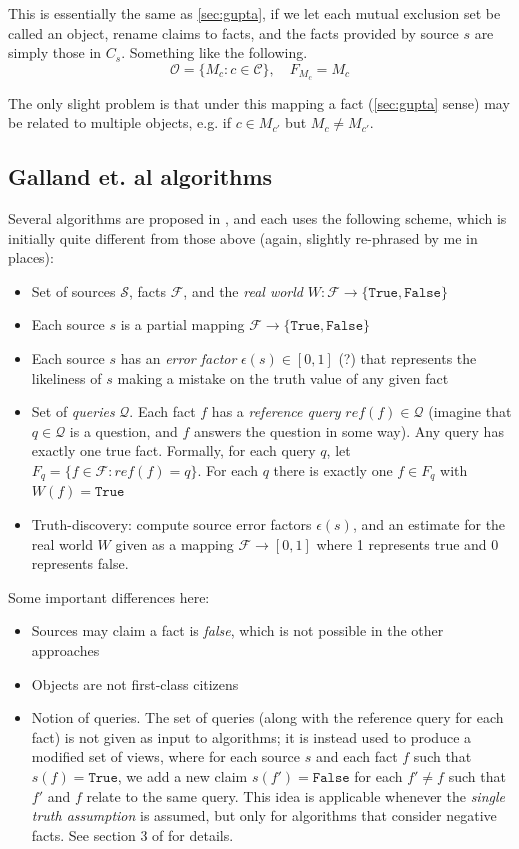 \documentclass{article}
\theoremstyle{definition} \newtheorem{definition}{Definition}
\theoremstyle{definition} \newtheorem{example}{Example}
\theoremstyle{plain} \newtheorem{axiom}{Axiom}
\theoremstyle{plain} \newtheorem*{remark}{Remark}
\theoremstyle{remark} \newtheorem*{notation}{Notation}
\theoremstyle{plain} \newtheorem{lemma}{Lemma}
\theoremstyle{plain} \newtheorem{proposition}{Proposition}
\renewcommand{\S}{\mathcal{S}}  %
\renewcommand{\O}{\mathcal{O}}  %
\newcommand{\F}{\mathcal{F}}
\begin{document}
This is essentially the same as \ref{sec:gupta}, if we let each mutual
exclusion set be called an object, rename claims to facts, and the facts
provided by source $s$ are simply those in $C_s$. Something like the following.
$$
\O = \{M_c : c \in \mathcal{C}\},
\quad
F_{M_c} = M_c
$$

The only slight problem is that under this mapping a fact (\ref{sec:gupta}
sense) may be related to multiple objects, e.g. if $c \in M_{c'}$ but $M_c \ne
M_{c'}$.

\subsection{Galland et. al algorithms}
\label{sec:galland}

Several algorithms are proposed in \cite{galland}, and each uses the following
scheme, which is initially quite different from those above (again, slightly
re-phrased by me in places):

\begin{itemize}
\item Set of sources $\S$, facts $\F$, and the \emph{real world}
$W: \F \rightarrow \{\texttt{True}, \texttt{False}\}$
\item Each source $s$ is a partial mapping $\F \rightarrow
\{\texttt{True}, \texttt{False}\}$
\item Each source $s$ has an \emph{error factor} $\epsilon(s) \in [0, 1]$ (?)
that represents the likeliness of $s$ making a mistake on the truth value of
any given fact
\item Set of \emph{queries} $\mathcal{Q}$. Each fact $f$ has a \emph{reference
query} $ref(f) \in \mathcal{Q}$ (imagine that $q\in\mathcal{Q}$ is a question,
and $f$ answers the question in some way). Any query has exactly one true fact.
Formally, for each query $q$, let $F_q = \{f \in \F : ref(f) = q\}$.
For each $q$ there is exactly one $f \in F_q$ with $W(f) = \texttt{True}$ \item
Truth-discovery: compute source error factors $\epsilon(s)$, and an estimate
for the real world $W$ given as a mapping $\F \rightarrow [0, 1]$ where 1
represents true and 0 represents false.
\end{itemize}

Some important differences here:
\begin{itemize}
\item Sources may claim a fact is \emph{false}, which is not possible in the
other approaches
\item Objects are not first-class citizens
\item Notion of queries. The set of queries (along with the reference query for
each fact) is not given as input to algorithms; it is instead used to produce a
modified set of views, where for each source $s$ and each fact $f$ such that
$s(f) = \texttt{True}$, we add a new claim $s(f')=\texttt{False}$ for each
$f' \ne f$ such that $f'$ and $f$ relate to the same query. This idea is
applicable whenever the \emph{single truth assumption} is assumed, but only for
algorithms that consider negative facts. See section 3 of \cite{galland} for
details.
\end{itemize}
\end{document}

